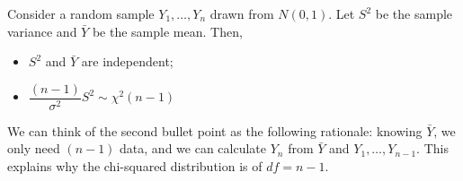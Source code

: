 \begin{thm}{}
	Consider a random sample $Y_1,\dots,Y_n$ drawn from $N(0,1)$. Let $S^2$	be the sample variance and $\bar Y$ be the sample mean. Then, 
	\begin{itemize}
		\item $S^2$ and $\bar Y$ are independent;
		\item $\dfrac{(n-1)}{\sigma^2}S^2\sim\chi^2(n-1)$
	\end{itemize}
\end{thm}
\begin{rmk}
	We can think of the second bullet point as the following rationale: knowing $\bar Y$, we only need $(n-1)$ data, and we can calculate $Y_n$ from $\bar Y$ and $Y_1,\dots,Y_{n-1}$. This explains why the chi-squared distribution is of $df=n-1$.	
\end{rmk}


